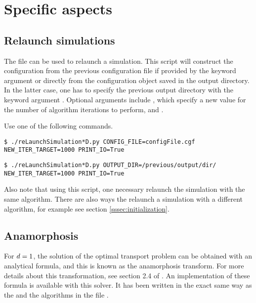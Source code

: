 
\section{Specific aspects}
\noindent
    
    \subsection{Relaunch simulations\label{sssec:relaunch-sim}}
    \noindent

        The \python file  can be used to relaunch a simulation. This script will construct
        the configuration from the previous configuration file if provided by the keyword argument 
        or directly from the configuration object saved in the output directory. In the latter case, one has to specify the
        previous output directory with the keyword argument . Optional arguments include
        , which specify a new value for the number of algorithm iterations to perform, and 
        .

        Use one of the following commands.
        \lstset{style=codebash}
        \begin{lstlisting}
$ ./reLaunchSimulation*D.py CONFIG_FILE=configFile.cgf NEW_ITER_TARGET=1000 PRINT_IO=True\end{lstlisting}
        \begin{lstlisting}
$ ./reLaunchSimulation*D.py OUTPUT_DIR=/previous/output/dir/ NEW_ITER_TARGET=1000 PRINT_IO=True\end{lstlisting}

        Also note that using this script, one necessary relaunch the simulation with the same algorithm. There are also ways
        the relaunch a simulation with a different algorithm, for example see section \ref{sssec:initialization}.

    \subsection{Anamorphosis\label{sssec:anamorphosis}}
    \noindent

        For $d=1$, the solution of the optimal transport problem can be obtained with an analytical formula, and this
        is known as the anamorphosis transform. For more details about this transformation, see section 2.4 of .
        An implementation of these formula is available with this solver. It has been written in the exact same way as the
        \drAlgo{} and the \pdAlgo{} algorithms in the file .

